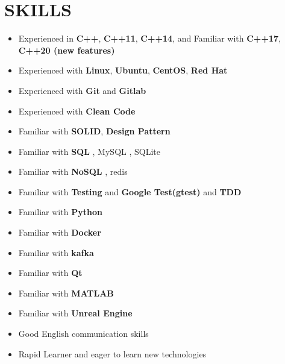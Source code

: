 \documentclass[11pt,a4paper,roman]{moderncv}
\begin{document}
\section{SKILLS}
\begin{minipage}{\maincolumnwidth}%
  \small{
      \begin{itemize}
	  \item Experienced  in \textbf{C++}, \textbf{C++11}, \textbf{C++14}, and Familiar with \textbf{C++17}, \textbf{C++20 (new features)}
          \item Experienced with \textbf{Linux}, \textbf{Ubuntu}, \textbf{CentOS}, \textbf{Red Hat}
          \item Experienced with \textbf{Git} and \textbf{Gitlab}
	  \item Experienced with \textbf{Clean Code}
	  \item Familiar with \textbf{SOLID}, \textbf{Design Pattern}
    \item Familiar with \textbf{SQL} , MySQL , SQLite
    \item Familiar with \textbf{NoSQL} , redis
	  \item Familiar with \textbf{Testing} and \textbf{Google Test(gtest)} and \textbf{TDD}
	  \item Familiar with \textbf{Python}
	  \item Familiar with \textbf{Docker}
	  \item Familiar with \textbf{kafka}
	  \item Familiar with \textbf{Qt}
	  \item Familiar with \textbf{MATLAB}
	  \item Familiar with \textbf{Unreal Engine}
          \item Good English communication skills
          \item Rapid Learner and eager to learn new technologies
    \end{itemize}}%
\end{minipage}%
      


\nocite{*}

 
\end{document}
